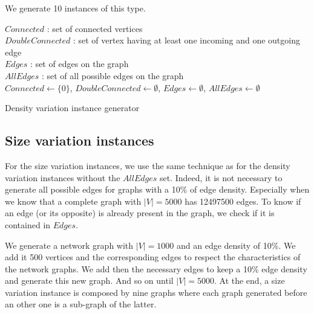We generate 10 instances of this type.


\begin{algorithm}[H]
 $Connected$ : set of connected vertices \\
 $DoubleConnected$ : set of vertex having at least one incoming and one outgoing edge \\
 $Edges$ : set of edges on the graph \\
 $AllEdges$ : set of all possible edges on the graph\\
 $Connected \gets \{0\}$, $DoubleConnected\gets \emptyset$, $Edges\gets \emptyset$, $AllEdges\gets \emptyset$\;
 



 \caption{Density variation instance generator}
\end{algorithm}

\subsection{Size variation instances}
For the size variation instances, we use the same technique as for the density variation instances without the $AllEdges$ set. Indeed, it is not necessary to generate all possible edges for graphs with a 10\% of edge density. Especially when we know that a complete graph with $|V|=5000$ has 12497500 edges. To know if an edge (or its opposite) is already present in the graph, we check if it is contained in $Edges$.

We generate a network graph with $|V|=1000$ and an edge density of 10\%. We add it 500 vertices and the corresponding edges to respect the characteristics of the network graphs. We add then the necessary edges to keep a 10\% edge density and generate this new graph. And so on until $|V|=5000$. At the end, a size variation instance is composed by nine graphs where each graph generated before an other one is a sub-graph of the latter.

